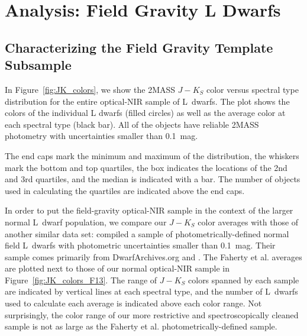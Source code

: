 \documentclass[12pt,preprint]{aastex}
\begin{document}


\section{Analysis: Field Gravity L Dwarfs}
\label{sec:fieldg}

\subsection{Characterizing the Field Gravity Template Subsample}
\label{sec:templates_normal}

In Figure~\ref{fig:JK_colors}, we show the 2MASS $J-K_S$ color versus spectral type distribution for the entire optical-NIR sample of L~dwarfs. The plot shows the colors of the individual L dwarfs (filled circles) as well as the average color at each spectral type (black bar). All of the objects have reliable 2MASS photometry with uncertainties smaller than 0.1~mag. 

The end caps mark the minimum and maximum of the distribution, the whiskers mark the bottom and top quartiles, the box indicates the locations of the 2nd and 3rd quartiles, and the median is indicated with a bar. The number of objects used in calculating the quartiles are indicated above the end caps.


In order to put the field-gravity optical-NIR sample in the context of the larger normal L~dwarf population, we compare our $J-K_S$ color averages with those of another similar data set: \citet{Faherty13_0355} compiled a sample of photometrically-defined normal field L~dwarfs with photometric uncertainties smaller than 0.1~mag. Their sample comes primarily from DwarfArchives.org and \cite{Schmidt10}. The Faherty et al. averages are plotted next to those of our normal optical-NIR sample in Figure~\ref{fig:JK_colors_F13}. The range of $J-K_S$ colors spanned by each sample are indicated by vertical lines at each spectral type, and the number of L~dwarfs used to calculate each average is indicated above each color range. Not surprisingly, the color range of our more restrictive and spectroscopically cleaned sample is not as large as the Faherty et al. photometrically-defined sample. 
\end{document}
